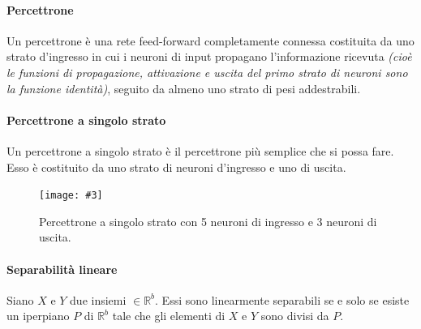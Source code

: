 \documentclass[12pt, twoside, letterpaper]{report}
\newcommand{\img}[4] {
	\begin{figure}
		\centering
		\texttt{[image: \#3]}\\
		\caption{#1}
		\label{fig:#4}
	\end{figure}
}
\begin{document}
			\paragraph{Percettrone} Un percettrone è una rete feed-forward completamente connessa costituita da uno strato d'ingresso in cui i neuroni di input propagano l'informazione ricevuta \textit{(cioè le funzioni di propagazione, attivazione e uscita del primo strato di neuroni sono la funzione identità)}, seguito da almeno uno strato di pesi addestrabili.
			
			\paragraph{Percettrone a singolo strato} Un percettrone a singolo strato è il percettrone più semplice che si possa fare. Esso è costituito da uno strato di neuroni d'ingresso e uno di uscita. 
				\img{Percettrone a singolo strato con 5 neuroni di ingresso e 3 neuroni di uscita. \cite{kriesel}}{0.5}{slp.png}{slp} 
				
			\paragraph{Separabilità lineare} Siano $X$ e $Y$ due insiemi $\in \mathbb{R}^b$. Essi sono linearmente separabili se e solo se esiste un iperpiano $P$ di $\mathbb{R}^b$ tale che gli elementi di $X$ e $Y$ sono divisi da $P$. 
			
\end{document}
